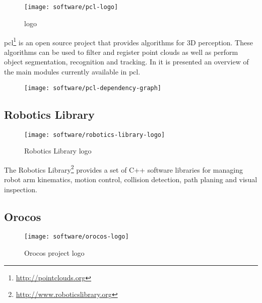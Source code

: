 \subsection{}

\begin{wrapfigure}{r}{0.23\textwidth}
	\centering
	\vspace*{-2em}
	\texttt{[image: software/pcl-logo]}
	\caption{ logo}
	\label{pcl-logo}
\end{wrapfigure}

\gls{pcl}\footnote{\url{http://pointclouds.org}} \cite{Rusu2011} is an open source project that provides algorithms for 3D perception. These algorithms can be used to filter and register point clouds as well as perform object segmentation, recognition and tracking. In  it is presented an overview of the main modules currently available in \gls{pcl}.

\begin{figure}[H]
	\centering
	\texttt{[image: software/pcl-dependency-graph]}
	\caption[]{\protect\footnotemark}
	\label{fig:pcl-dependency-graph}
\end{figure}


\subsection{Robotics Library}

\begin{wrapfigure}{r}{0.23\textwidth}
	\centering
	\vspace*{-2em}
	\texttt{[image: software/robotics-library-logo]}
	\caption{Robotics Library logo}
	\label{fig:robotics-library-logo}
\end{wrapfigure}

The Robotics Library\footnote{\url{http://www.roboticslibrary.org}} provides a set of C++ software libraries for managing robot arm kinematics, motion control, collision detection, path planing and visual inspection.


\subsection{Orocos}

\begin{wrapfigure}{r}{0.23\textwidth}
	\centering
	\vspace*{-2em}
	\texttt{[image: software/orocos-logo]}
	\caption{Orocos project logo}
	\label{fig:orocos-logo}
\end{wrapfigure}

